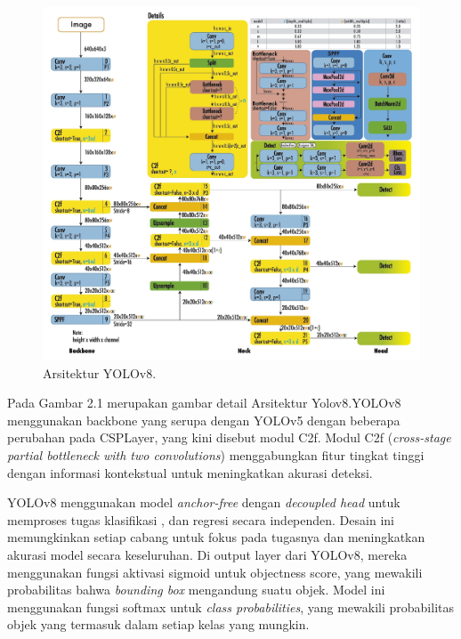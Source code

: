 \begin{figure}[H]
  \centering

  \includegraphics[scale=0.5]{gambar/YoloV8Architecture.jpg}

  \caption{Arsitektur YOLOv8.}
  \label{fig:Arsitektur Yolov8}
\end{figure}

Pada Gambar 2.1 merupakan gambar detail Arsitektur Yolov8.YOLOv8 menggunakan backbone yang serupa dengan YOLOv5 dengan beberapa perubahan pada CSPLayer, yang kini disebut modul C2f. Modul C2f (\emph{cross-stage partial bottleneck with two convolutions}) menggabungkan fitur tingkat tinggi dengan informasi kontekstual untuk meningkatkan akurasi deteksi.

YOLOv8 menggunakan model \emph{anchor-free} dengan \emph{decoupled head} untuk memproses tugas klasifikasi , dan regresi secara independen. Desain ini memungkinkan setiap cabang untuk fokus pada tugasnya dan meningkatkan akurasi model secara keseluruhan. Di output layer dari YOLOv8, mereka menggunakan fungsi aktivasi sigmoid untuk objectness score, yang mewakili probabilitas bahwa \emph{bounding box} mengandung suatu objek. Model ini menggunakan fungsi softmax untuk \emph{class probabilities}, yang mewakili probabilitas objek yang termasuk dalam setiap kelas yang mungkin.


